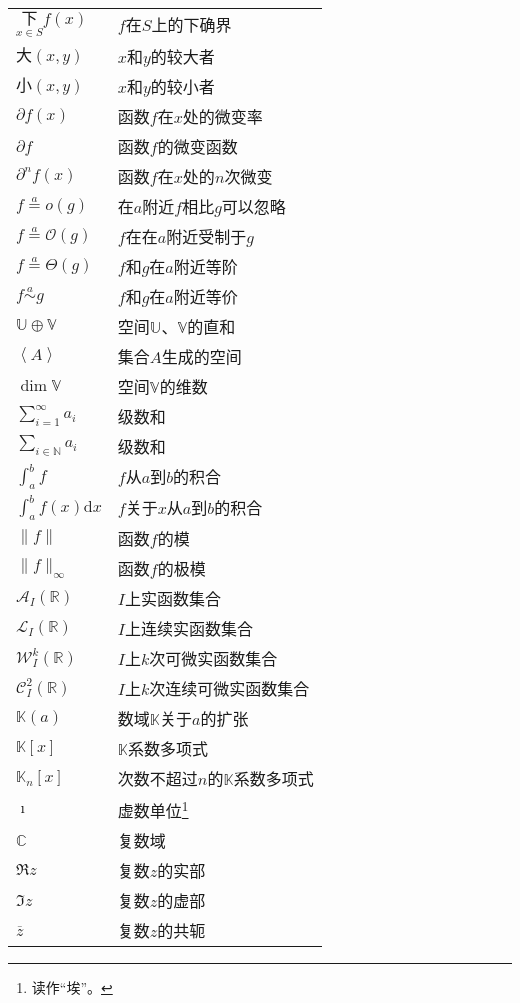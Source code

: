 \documentclass[12pt,UTF8]{article}
\newcommand{\oveq}[1]{\overset{#1}{=}}
\newcommand{\olim}[1]{\mathit{o}\left(#1\right)}  %
\newcommand{\Olim}[1]{\mathcal{O}\left(#1\right)}  %
\newcommand{\Tlim}[1]{\mathcal{\Theta}\left(#1\right)}  %
\newcommand{\eqlim}[1]{\overset{#1}{\sim}}  %
\newcommand{\vect}[1]{\left\langle #1 \right\rangle}
\begin{document}
\begin{longtable}{ m{15em} m{15em} }
    $\underset{x\in S}{\text{下}} f(x)$ & $f$在$S$上的下确界\\
    $\text{大}(x, y)$ & $x$和$y$的较大者 \\
    $\text{小}(x, y)$ & $x$和$y$的较小者 \\
    $\partial f(x)$ & 函数$f$在$x$处的微变率 \\
    $\partial f$ & 函数$f$的微变函数 \\
    $\partial^n f(x)$ & 函数$f$在$x$处的$n$次微变 \\
    $ f \oveq{a} \olim{g}$ & 在$a$附近$f$相比$g$可以忽略 \\
    $ f \oveq{a} \Olim{g}$ & $f$在在$a$附近受制于$g$ \\
    $ f \oveq{a} \Tlim{g}$ & $f$和$g$在$a$附近等阶 \\
    $ f \eqlim{a} g$ & $f$和$g$在$a$附近等价 \\
    $\mathbb{U} \oplus \mathbb{V}$ & 空间$\mathbb{U}$、$\mathbb{V}$的直和 \\
    $\vect{A}$ & 集合$A$生成的空间 \\
    $\dim{\mathbb{V}}$ & 空间$\mathbb{V}$的维数 \\
    $\displaystyle\sum_{i=1}^\infty a_i$ & 级数和 \\
    $\displaystyle\sum_{i\in\mathbb{N}} a_i$ & 级数和 \\
    $\displaystyle\int_{a}^b f$ & $f$从$a$到$b$的积合 \\
    $\displaystyle\int_{a}^b f(x)\mathrm{d}x$ & $f$关于$x$从$a$到$b$的积合 \\
    $\|f\|$ & 函数$f$的模 \\
    $\|f\|_{\infty}$ & 函数$f$的极模 \\
    $\mathcal{A}_I(\mathbb{R})$ & $I$上实函数集合 \\
    $\mathcal{L}_I(\mathbb{R})$ & $I$上连续实函数集合 \\
    $\mathcal{W}^k_I(\mathbb{R})$ & $I$上$k$次可微实函数集合 \\
    $\mathcal{C}^2_I(\mathbb{R})$ & $I$上$k$次连续可微实函数集合 \\
    $\mathbb{K}(a)$ & 数域$\mathbb{K}$关于$a$的扩张 \\
    $\mathbb{K}[x]$ & $\mathbb{K}$系数多项式 \\
    $\mathbb{K}_n[x]$ & 次数不超过$n$的$\mathbb{K}$系数多项式 \\
    $\imath$ & 虚数单位\footnote{读作“埃”。} \\
    $\mathbb{C}$ & 复数域 \\
    $\Re{z}$ & 复数$z$的实部 \\
    $\Im{z}$ & 复数$z$的虚部 \\
    $\overline{z}$ & 复数$z$的共轭 \\


\end{longtable}
\end{document}
